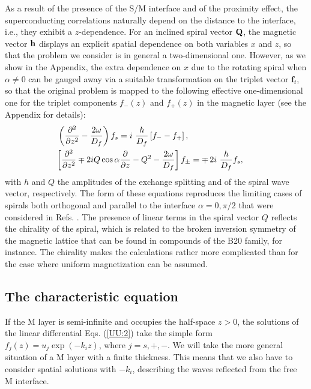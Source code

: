 \documentclass[prb,amsmath,amssymb,reprint]{revtex4-2}
\begin{document}
As a result of the presence of the S/M interface and of the proximity effect, the superconducting correlations naturally depend on the distance to the interface, i.e., they exhibit a $z$-dependence.
For an inclined spiral vector ${\bf Q}$, the magnetic vector ${\bf h}$ displays an explicit spatial dependence on both variables $x$ and $z$, so that the problem we consider is in general a two-dimensional one. However, as we show in the Appendix, the extra dependence on $x$ due to the rotating spiral when $\alpha \neq 0$ can be gauged away via a suitable transformation on the triplet vector $\mathbf{f}_{t}$, so that the original problem is mapped to the following effective one-dimensional one for the triplet components $f_{-}(z)$ and $f_{+}(z)$ in the magnetic layer (see the Appendix for details):
\begin{eqnarray}
\left( \frac{\partial ^{2}}{\partial z^{2}}-\frac{2\omega }{D_{f}}\right)
f_{s} =i\ \frac{h}{D_{f}}\left[ f_{-}-f_{+}\right] ,  \hspace*{2.8cm} \notag \\
\left[ \frac{\partial ^{2}}{\partial z^{2}} \mp 2iQ\cos \alpha \frac{\partial }{%
\partial z}-Q^{2}-\frac{2\omega }{D_{f}}\right] f_{\pm} = \mp \, 2i\ \frac{h}{D_{f}}%
f_{s}, \hspace*{0.5cm} \label{UU:2}
\end{eqnarray}
with $h$ and $Q$ the amplitudes of the exchange splitting and of the spiral wave vector, respectively.
The form of these equations reproduces the limiting cases of spirals both orthogonal and parallel to the interface $\alpha=0,\pi/2$ that were considered in Refs. .
The presence of linear terms in the spiral vector $Q$ reflects the chirality of the spiral, which is related to the broken inversion symmetry of the magnetic lattice that can be found in compounds of the B20 family, for instance. The chirality makes the calculations rather more complicated than for the case where uniform magnetization can be assumed.

\subsection{The characteristic equation}

If the M layer is semi-infinite and occupies the half-space $z>0$, the
solutions of the linear differential Eqs. (\ref{UU:2}) take the simple form  $f_{j}(z)=u_{j}\exp (-k_{i}z)$, where $j={s,+,-}$. We will take the more general situation of a M layer with a finite thickness. This means that we also have to consider spatial solutions with $-k_{i}$, describing the waves reflected from the free M interface.
\end{document}
